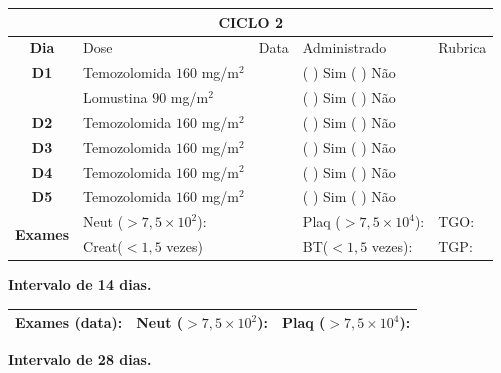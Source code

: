 \documentclass[11pt,a4paper,oldfontcommands]{memoir}
\begin{document}
\begin{center}
\begin{longtable}{p{1cm}p{4cm}|p{1cm}|p{4.6cm}|p{3cm}}
	\hline
	\multicolumn{5}{c}{\textbf{CICLO 2}}\\
\hline
    \multicolumn{1}{c|}{\multirow{1}{*}{\textbf{Dia}}}&{Dose}&{Data}&{Administrado}&{Rubrica} \\
    \hline
    \multicolumn{1}{c|}{\multirow{1}{*}{\textbf{D1}}}&{Temozolomida \(160\) mg/m\(^2\)}&&{(  ) Sim (  ) Não}&\\
    \multicolumn{1}{c|}{\multirow{1}{*}{\textbf{}}}&{Lomustina \(90\) mg/m\(^2\)}&&{(  ) Sim (  ) Não}&\\
    \multicolumn{1}{c|}{\multirow{1}{*}{\textbf{D2}}}&{Temozolomida \(160\) mg/m\(^2\)}&&{(  ) Sim (  ) Não}&\\
    \multicolumn{1}{c|}{\multirow{1}{*}{\textbf{D3}}}&{Temozolomida \(160\) mg/m\(^2\)}&&{(  ) Sim (  ) Não}&\\
    \multicolumn{1}{c|}{\multirow{1}{*}{\textbf{D4}}}&{Temozolomida \(160\) mg/m\(^2\)}&&{(  ) Sim (  ) Não}&\\
    \multicolumn{1}{c|}{\multirow{1}{*}{\textbf{D5}}}&{Temozolomida \(160\) mg/m\(^2\)}&&{(  ) Sim (  ) Não}&\\
    \hline
    \multicolumn{1}{c|}{\multirow{2}{*}{\textbf{Exames}}}&\multicolumn{2}{l|}{Neut (\(>7,5\times10^2\)):}&{Plaq (\(>7,5\times10^4\)):}&{TGO:}\\
    \cline{2-5}
    \multicolumn{1}{c|}{\multirow{2}{*}{{}}}&\multicolumn{2}{l|}{Creat(\(<1,5\) vezes)}&{BT(\(<1,5\) vezes):}&{TGP:}
    \\
    \hline
\end{longtable}
\textbf{Intervalo de 14 dias.}
\begin{longtable}{p{5cm}|p{5cm}|p{4.5cm}}
    \hline
    \textbf{Exames (data):}&{Neut (\(>7,5\times10^2\)):}&{Plaq (\(>7,5\times10^4\)):}
    \\
    \hline
\end{longtable}
\textbf{Intervalo de 28 dias.}
\\[1.5cm]
\end{center}
\clearpage
\end{document}
